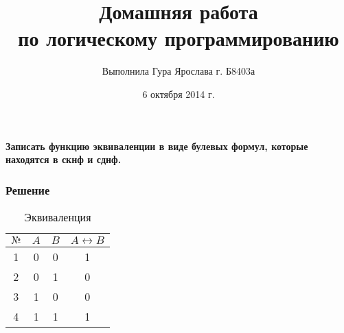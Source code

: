 \documentclass[a4paper,titlepage,oneside]{article}
\title{Домашняя работа\\
 	по логическому программированию}
\author{Выполнила Гура Ярослава г. Б8403а}
\date{6 октября 2014 г.}
\begin{document}
	\maketitle

	\hspace{1em}
	
\begin{center}
    \textbf{ Записать функцию эквиваленции в виде булевых формул, которые находятся в скнф и сднф.}
\end{center} 

\subsubsection*{Решение}
\begin{table}[h]
	\caption{Эквиваленция}
	\begin{center}
		\begin{tabular}{|c|c|c|c|}
			\hline
			$№$ & $A$ & $B$ & $A \longleftrightarrow B$\\
			\hline
			1 & 0 & 0 & 1 \\
			\hline
			2 & 0 & 1 & 0 \\
			\hline
			3 & 1 & 0 & 0 \\
			\hline
			4 & 1 & 1 & 1 \\
			\hline
		\end{tabular}
	\end{center}
\end{table}
\end{document}
